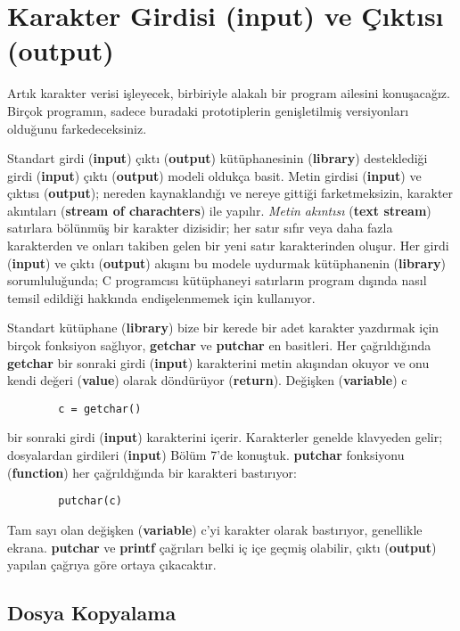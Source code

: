 \documentclass[a4paper,12pt,oneside]{book}
\begin{document}
\section{Karakter Girdisi (input) ve Çıktısı (output)}

Artık karakter verisi işleyecek, birbiriyle alakalı bir program ailesini konuşacağız. Birçok programın, sadece buradaki prototiplerin genişletilmiş versiyonları olduğunu farkedeceksiniz.
\par Standart girdi (\textbf{input}) çıktı (\textbf{output}) kütüphanesinin (\textbf{library}) desteklediği girdi (\textbf{input}) çıktı (\textbf{output}) modeli oldukça basit. Metin girdisi (\textbf{input}) ve çıktısı (\textbf{output}); nereden kaynaklandığı ve nereye gittiği farketmeksizin, karakter akıntıları (\textbf{stream of charachters}) ile yapılır. \textit{Metin akıntısı} (\textbf{text stream}) satırlara bölünmüş bir karakter dizisidir; her satır sıfır veya daha fazla karakterden ve onları takiben gelen bir yeni satır karakterinden oluşur. Her girdi (\textbf{input}) ve çıktı (\textbf{output}) akışını bu modele uydurmak kütüphanenin (\textbf{library}) sorumluluğunda; C programcısı kütüphaneyi satırların program dışında nasıl temsil edildiği hakkında endişelenmemek için kullanıyor.
\par Standart kütüphane (\textbf{library}) bize bir kerede bir adet karakter yazdırmak için birçok fonksiyon sağlıyor, \textbf{getchar} ve \textbf{putchar} en basitleri. Her çağrıldığında \textbf{getchar} bir sonraki girdi (\textbf{input}) karakterini metin akışından okuyor ve onu kendi değeri (\textbf{value}) olarak döndürüyor (\textbf{return}). Değişken (\textbf{variable}) c
\begin{lstlisting}
		c = getchar()
\end{lstlisting}
bir sonraki girdi (\textbf{input}) karakterini içerir. Karakterler genelde klavyeden gelir; dosyalardan girdileri (\textbf{input}) Bölüm 7'de konuştuk.
\textbf{putchar} fonksiyonu (\textbf{function}) her çağrıldığında bir karakteri bastırıyor:
\begin{lstlisting}
		putchar(c)
\end{lstlisting}
Tam sayı olan değişken (\textbf{variable}) c'yi karakter olarak bastırıyor, genellikle ekrana. \textbf{putchar} ve \textbf{printf} çağrıları belki iç içe geçmiş olabilir, çıktı (\textbf{output}) yapılan çağrıya göre ortaya çıkacaktır. \pagebreak

\subsection{Dosya Kopyalama}
\end{document}
